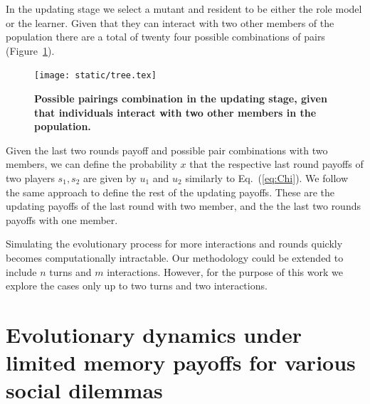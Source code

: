 \documentclass[11pt]{article}
\theoremstyle{plainCl1}
\theoremstyle{plainCl2}
\begin{document}
In the updating stage we select a mutant and resident to be either the role
model or the learner. Given that they can interact with two other members of
the population there are a total of twenty four possible combinations of pairs
(Figure~\ref{fig:pissible_two_pairs}).

\begin{figure}[!htbp]
  \centering
  \texttt{[image: static/tree.tex]}
  \caption{\textbf{Possible pairings combination in the updating stage, given
  that individuals interact with two other members in the population.}}
  \label{fig:pissible_two_pairs}
\end{figure}

Given the last two rounds payoff and possible pair combinations with two
members, we can define the probability \(x\) that the respective last round
payoffs of two players \(s_1, s_2\) are given by $u_1$ and $u_2$ similarly to
Eq.~(\ref{eq:Chi}). We follow the same approach to define the rest of the
updating payoffs. These are the updating payoffs of the last round with two
member, and the the last two rounds payoffs with one member.

Simulating the evolutionary process for more interactions and rounds quickly
becomes computationally intractable. Our methodology could be extended to
include \(n\) turns and \(m\) interactions. However, for the purpose of this
work we explore the cases only up to two turns and two interactions.


\section{Evolutionary dynamics under limited memory payoffs for various social dilemmas}\label{appendix:further_simulation_results}
\end{document}
